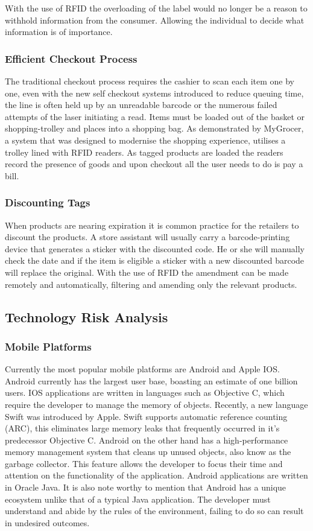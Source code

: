 \documentclass[a4paper, 11pt]{article}
\begin{document}
With the use of RFID the overloading of the label would no longer be a reason to withhold information from the consumer. Allowing the individual to decide what information is of importance.

\subsubsection{Efficient Checkout Process} The traditional checkout process requires the cashier to scan each item one by one, even with the new self checkout systems introduced to reduce queuing time, the line is often held up by an unreadable barcode or the numerous failed attempts of the laser initiating a read. Items must be loaded out of the basket or shopping-trolley and places into a shopping bag. As demonstrated by MyGrocer, a system that was designed to modernise the shopping experience, utilises a trolley lined with RFID readers. As tagged products are loaded the readers record the presence of goods and upon checkout all the user needs to do is pay a bill. 

\subsubsection{Discounting Tags} When products are nearing expiration it is common practice for the retailers to discount the products. A store assistant will usually carry a barcode-printing device that generates a sticker with the discounted code. He or she will manually check the date and if the item is eligible a sticker with a new discounted barcode will replace the original. With the use of RFID the amendment can be made remotely and automatically, filtering and amending only the relevant products. 

\subsection{Technology Risk Analysis}
\subsubsection{Mobile Platforms}
Currently the most popular mobile platforms are Android and Apple IOS. Android currently has the largest user base, boasting an estimate of one billion users. IOS applications are written in languages such as Objective C, which require the developer to manage the memory of objects. Recently, a new language Swift was introduced by Apple. Swift supports automatic reference counting (ARC), this eliminates large memory leaks that frequently occurred in it's predecessor Objective C. Android on the other hand has a high-performance memory management system that cleans up unused objects, also know as the garbage collector. This feature allows the developer to focus their time and attention on the functionality of the application. Android applications are written in Oracle Java. It is also note worthy to mention that Android has a unique ecosystem unlike that of a typical Java application. The developer must understand and abide by the rules of the environment, failing to do so can result in undesired outcomes. \cite{android}\cite{iOS}
\end{document}
